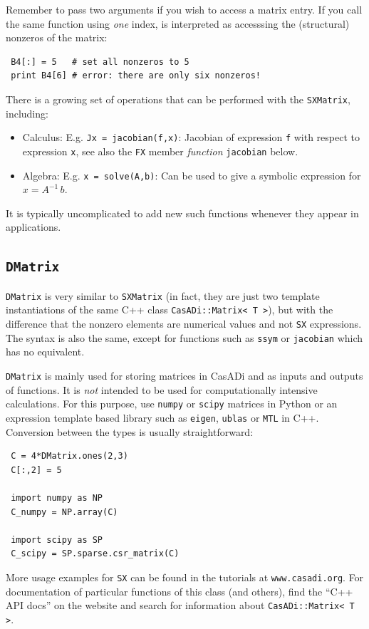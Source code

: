 \documentclass[a4paper,12pt]{book}
\begin{document}
{Remember to pass two arguments if you wish to access a matrix entry. If you call the same function using \emph{one} index, is interpreted as accesssing the (structural) nonzeros of the matrix:
\begin{verbatim}
 B4[:] = 5   # set all nonzeros to 5
 print B4[6] # error: there are only six nonzeros!
\end{verbatim}

There is a growing set of operations that can be performed with the \texttt{SXMatrix}, including:
\begin{itemize}
 \item Calculus: E.g. \verb|Jx = jacobian(f,x)|: Jacobian of expression \texttt{f} with respect to expression \texttt{x}, see also the \texttt{FX} member \emph{function} \texttt{jacobian} below.
 \item Algebra: E.g. \verb|x = solve(A,b)|: Can be used to give a symbolic expression for $x = A^{-1} \, b$.
\end{itemize}
It is typically uncomplicated to add new such functions whenever they appear in applications.

\subsection{\texttt{DMatrix}}
\texttt{DMatrix} is very similar to \texttt{SXMatrix} (in fact, they are just two template instantiations of the same C++ class \texttt{CasADi::Matrix<\,T\,>}), but with the difference that the nonzero elements are numerical values and not \texttt{SX} expressions. The syntax is also the same, except for functions such as \texttt{ssym} or \texttt{jacobian} which has no equivalent.

\texttt{DMatrix} is mainly used for storing matrices in CasADi and as inputs and outputs of functions. It is \emph{not} intended to be used for computationally intensive calculations. For this purpose, use \texttt{numpy} or \texttt{scipy} matrices in Python or an expression template based library such as \texttt{eigen}, \texttt{ublas} or \texttt{MTL} in C++. Conversion between the types is usually straightforward:
\begin{verbatim}
 C = 4*DMatrix.ones(2,3)
 C[:,2] = 5

 import numpy as NP
 C_numpy = NP.array(C)

 import scipy as SP
 C_scipy = SP.sparse.csr_matrix(C)
\end{verbatim}

More usage examples for \texttt{SX} can be found in the tutorials at \texttt{www.casadi.org}. For documentation of particular functions of this class (and others), find the ``C++ API docs'' on the website and search for information about \texttt{CasADi::Matrix<\,T\,>}.

}
\end{document}
